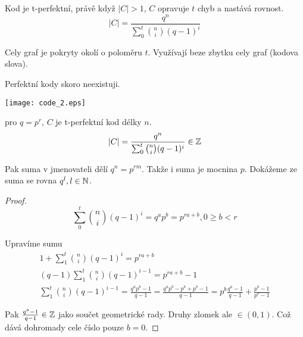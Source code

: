 \begin{definition}
	Kod je t-perfektní, právě když $|C| > 1$, $C$ opravuje $t$ chyb a nastává rovnost.
	\[ |C| = \frac{q^n}{\sum_0^t \binom{n}{i} (q - 1)^i} \]

	Cely graf je pokryty okolí o poloměru $t$. Využívají beze zbytku cely graf (kodova slova).
\end{definition}

\begin{note}
	Perfektní kody skoro neexistuji.

	\texttt{[image: code\_2.eps]}
\end{note}

\begin{observation}
	pro $q = p^r$, $C$ je t-perfektní kod délky $n$.
	\[ |C| = \frac{q^n}{\sum_0^t \binom{n}{i} (q - 1)^i} \in \operatorname{\mathbb{Z}} \]

	Pak suma v jmenovateli dělí $q^n = p^{rm}$. Takže i suma je mocnina $p$. Dokážeme ze suma se rovna $q^l, l \in \operatorname{\mathbb{N}}$.

\end{observation}

\begin{proof}
	\[ \sum_0^t \binom{n}{i} (q - 1)^i = q^a p^b = p^{ra + b}, 0 \geq b < r \]

	Upravíme sumu
	\begin{gather*}
	1 + \sum_1^t \binom{n}{i} (q - 1)^i = p^{ra + b}\\
	(q - 1)\sum_1^t \binom{n}{i} (q - 1)^{i - 1} = p^{ra + b} - 1\\
	\sum_1^t \binom{n}{i} (q - 1)^{i - 1} = \frac{q^ap^b - 1}{q - 1} = \frac{q^ap^b - p^b + p^b - 1}{q - 1} = p^b \frac{q^a - 1}{q - 1} + \frac{p^b - 1}{p^r - 1}
	\end{gather*}

	Pak $\frac{q^a - 1}{q - 1} \in \operatorname{\mathbb{Z}}$ jako součet geometrické rady. Druhy zlomek ale $\in (0, 1)$. Což dává dohromady cele číslo pouze $b = 0$.
\end{proof}

